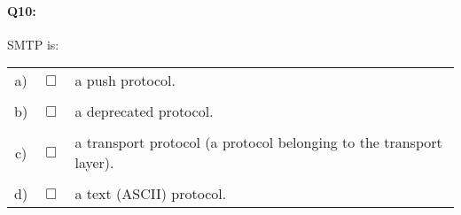 \documentclass{llncs}
\newcommand{\answer}[1]{}%
\begin{document}
\paragraph{\textbf{Q10:}} SMTP is:\\

\begin{tabular}{ccl}
  a) & $\Box$ & a push protocol.\\
  \\
  b) & $\Box$ & a deprecated protocol.\\
  \\
  c) & $\Box$ & a transport protocol (a protocol belonging to the transport layer).\\
  \\
  d) & $\Box$ & a text (ASCII) protocol.\\
\end{tabular}

\answer{See slides 47 and 51 in Chapter 2. SMTP is still used in all
  email communications -- it is not deprecated. It is an application
  protocol, not a transport one.}
\end{document}
